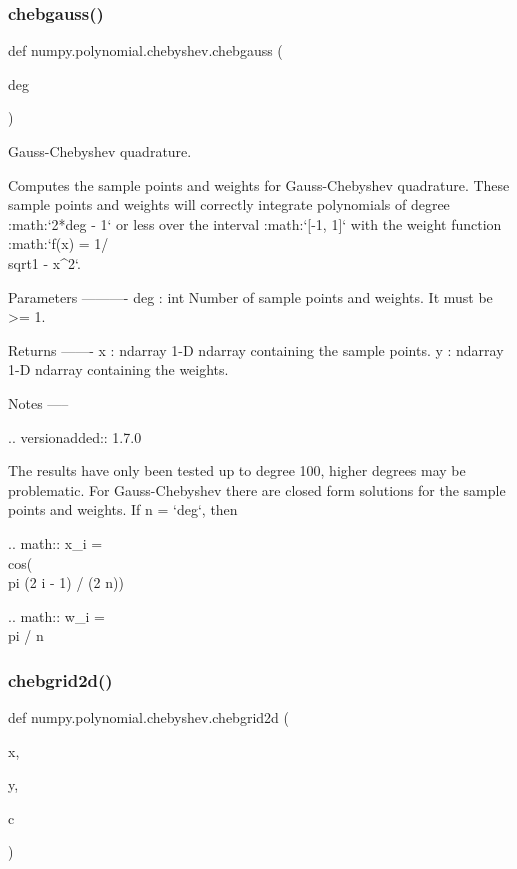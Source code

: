 \subsubsection{\texorpdfstring{chebgauss()}{chebgauss()}}
{\footnotesize\ttfamily def numpy.\+polynomial.\+chebyshev.\+chebgauss (\begin{DoxyParamCaption}\item[{}]{deg }\end{DoxyParamCaption})}

\begin{DoxyVerb}Gauss-Chebyshev quadrature.

Computes the sample points and weights for Gauss-Chebyshev quadrature.
These sample points and weights will correctly integrate polynomials of
degree :math:`2*deg - 1` or less over the interval :math:`[-1, 1]` with
the weight function :math:`f(x) = 1/\\sqrt{1 - x^2}`.

Parameters
----------
deg : int
    Number of sample points and weights. It must be >= 1.

Returns
-------
x : ndarray
    1-D ndarray containing the sample points.
y : ndarray
    1-D ndarray containing the weights.

Notes
-----

.. versionadded:: 1.7.0

The results have only been tested up to degree 100, higher degrees may
be problematic. For Gauss-Chebyshev there are closed form solutions for
the sample points and weights. If n = `deg`, then

.. math:: x_i = \\cos(\\pi (2 i - 1) / (2 n))

.. math:: w_i = \\pi / n\end{DoxyVerb}
 \mbox{\label{namespacenumpy_1_1polynomial_1_1chebyshev_aaecf6fa412715f5d8b819ea9d25f7868}} 
\subsubsection{\texorpdfstring{chebgrid2d()}{chebgrid2d()}}
{\footnotesize\ttfamily def numpy.\+polynomial.\+chebyshev.\+chebgrid2d (\begin{DoxyParamCaption}\item[{}]{x,  }\item[{}]{y,  }\item[{}]{c }\end{DoxyParamCaption})}

